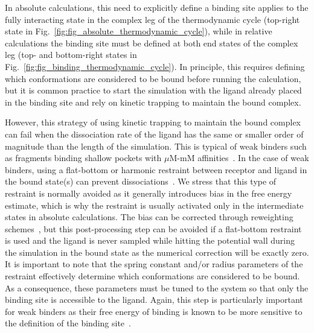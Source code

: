 \documentclass[9pt,bestpractices]{livecoms}
\begin{document}
In absolute calculations, this need to explicitly define a binding site applies to the fully interacting state in the complex leg of the thermodynamic cycle (top-right state in Fig.~\ref{fig:fig_absolute_thermodynamic_cycle}), while in relative calculations the binding site must be defined at both end states of the complex leg (top- and bottom-right states in Fig.~\ref{fig:fig_binding_thermodynamic_cycle}).
In principle, this requires defining which conformations are considered to be bound before running the calculation, but it is common practice to start the simulation with the ligand already placed in the binding site and rely on kinetic trapping to maintain the bound complex.

However, this strategy of using kinetic trapping to maintain the bound complex can fail when the dissociation rate of the ligand has the same or smaller order of magnitude than the length of the simulation.
This is typical of weak binders such as fragments binding shallow pockets with $\mu$M-mM affinities~\cite{georgiou2017pushing,pan2017quantitative}.
In the case of weak binders, using a flat-bottom or harmonic restraint between receptor and ligand in the bound state(s) can prevent dissociations~\cite{georgiou2017pushing,rizzi2019sampl6}.
We stress that this type of restraint is normally avoided as it generally introduces bias in the free energy estimate, which is why the restraint is usually activated only in the intermediate states in absolute calculations.
The bias can be corrected through reweighting schemes~\cite{rizzi2019sampl6}, but this post-processing step can be avoided if a flat-bottom restraint is used and the ligand is never sampled while hitting the potential wall during the simulation in the bound state as the numerical correction will be exactly zero.
It is important to note that the spring constant and/or radius parameters of the restraint effectively determine which conformations are considered to be bound.
As a consequence, these parameters must be tuned to the system so that only the binding site is accessible to the ligand.
Again, this step is particularly important for weak binders as their free energy of binding is known to be more sensitive to the definition of the binding site~\cite{gilson1997statisticalthermodynamic}.
\end{document}
